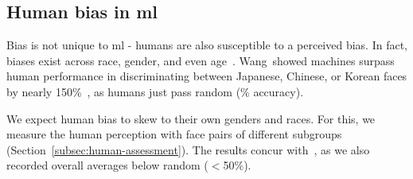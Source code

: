 \subsection{Human bias in \gls{ml}}
Bias is not unique to \gls{ml} - humans are also susceptible to a perceived bias. In fact, biases exist across race, gender, and even age~\cite{10.1007/978-3-030-13469-3_68, bar2006, meissner2001, nicholls2018}. Wang~\etal showed machines surpass human performance in discriminating between Japanese, Chinese, or Korean faces by nearly 150\%~\cite{wang2018they}, as humans just pass random (\% accuracy).

We expect human bias to skew to their own genders and races. For this, we measure the human perception with face pairs of different subgroups (Section~\ref{subsec:human-assessment}). The results concur with~\cite{wang2018they}, as we also recorded overall averages below random ($<$50\%). %
